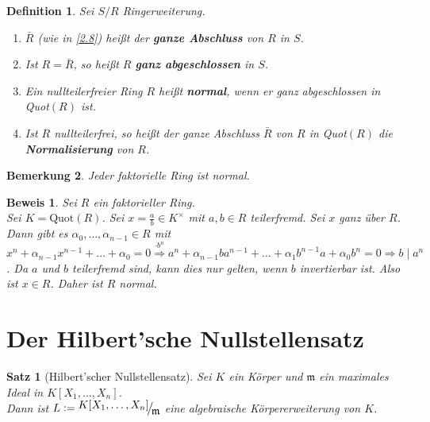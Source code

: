 \documentclass[a4paper,12pt]{scrbook}
\theoremstyle{break}
\newtheorem{Satz}{Satz}
\newtheorem{Def}{Definition}[chapter]
\newtheorem{Bem}[Def]{Bemerkung}
\theoremstyle{nonumberbreak}
\newtheorem{Bew}{Beweis}
\theoremstyle{nonumberplain}
\newcommand{\emp}[1]{\textbf{\emph{#1}}}
\newcommand{\defeqr}[0]{\mathrel{\mathop:}=}
\newcommand{\FakRaum}[2]{
  \raisebox{0.7ex}{\ensuremath{#1}}
  \ensuremath{\mkern-3mu}\big/\ensuremath{\mkern-3mu}
  \raisebox{-0.6ex}{\ensuremath{#2}}}
\begin{document}
\begin{Def} 
  Sei $S/R$ Ringerweiterung.
  \begin{enumerate} 
    \item $\bar{R}$ (wie in \ref{2.8}) heißt der \emp{ganze
          Abschluss} von $R$ in $S$.
    \item Ist $R = \bar{R}$, so heißt $R$ \emp{ganz
          abgeschlossen} in $S$.
    \item Ein nullteilerfreier Ring $R$ heißt \emp{normal}, wenn er ganz
          abgeschlossen in Quot$(R)$ ist.
    \item Ist $R$ nullteilerfrei, so heißt der ganze Abschluss $\bar{R}$ von $R$
          in Quot$(R)$ die \emp{Normalisierung} von $R$.
  \end{enumerate}
\end{Def}

\begin{Bem}
\label{2.10}
  Jeder faktorielle Ring ist normal.
\end{Bem}

\begin{Bew} 
  Sei $R$ ein faktorieller Ring. \\
  Sei $K=\mbox{Quot}(R)$. Sei $x= \frac{a}{b} \in K^\times$ mit $a,b \in R$ teilerfremd.
  Sei $x$ ganz über $R$. Dann gibt es $\alpha_0, \dots, \alpha_{n-1} \in R$ mit
  $x^n + \alpha_{n-1} x^{n-1} + \dots + \alpha_0 = 0 \overset{\cdot b^n}{\Rightarrow}
  a^n + \alpha_{n-1} b a^{n-1} + \dots + \alpha_1 b^{n-1} a + \alpha_0 b^n = 0
  \Rightarrow b \mid a^n$. Da $a$ und $b$ teilerfremd sind, kann dies nur gelten, wenn $b$
  invertierbar ist. Also ist $x \in R$. Daher ist $R$ normal.
\end{Bew}
\section{Der Hilbert'sche Nullstellensatz}

\begin{Satz}[Hilbert'scher Nullstellensatz]
\label{Satz5}
Sei $K$ ein Körper und $\mathfrak{m}$ ein maximales Ideal in $K[X_1, \dots,
X_n]$.\\
Dann ist $L \defeqr \FakRaum{K[X_1, \dots, X_n]}{\mathfrak{m}}$ eine
algebraische Körpererweiterung von $K$.
\end{Satz}
\end{document}
